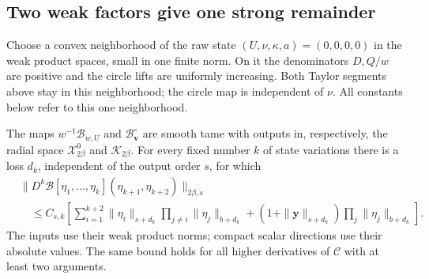 \subsection{Two weak factors give one strong remainder}

Choose a convex neighborhood of the raw state
$(U,\nu,\kappa,a)=(0,0,0,0)$ in the weak product spaces, small in
one finite norm. On it the denominators $D,Q/w$ are positive and
the circle lifts are uniformly increasing. Both Taylor segments
above stay in this neighborhood; the circle map is independent of
$\nu$. All constants below refer to this one neighborhood.

\begin{lemma}
\label{lem:posterior-two-weight}
The maps $w^{-1}\mathcal B_{w,U}$ and
$\mathcal B^\circ_{\mathbf v}$ are smooth tame with outputs in,
respectively, the radial space $\mathcal X^0_{2\beta}$ and
$\mathcal K_{2\beta}$. For every fixed number $k$ of state
variations there is a loss $d_k$, independent of the output order
$s$, for which
\begin{equation}\label{eq:posterior-multilinear-bound}
 \begin{split}
 &\|D^k\mathcal B[\eta_1,\ldots,\eta_k]
                         (\eta_{k+1},\eta_{k+2})\|_{2\beta,s}\\
 &\quad\le C_{s,k}\left[
   \sum_{i=1}^{k+2}\|\eta_i\|_{s+d_k}
                    \prod_{j\ne i}\|\eta_j\|_{b+d_k}
   +(1+\|\mathbf y\|_{s+d_k})
                    \prod_j\|\eta_j\|_{b+d_k}\right].
 \end{split}
\end{equation}
The inputs use their weak product norms; compact scalar directions
use their absolute values. The same bound holds for all higher
derivatives of $\mathcal C$ with at least two arguments.
\end{lemma}

